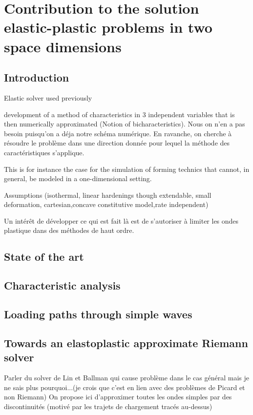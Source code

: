 \chapter{Contribution to the solution elastic-plastic problems in two space dimensions}

\section*{Introduction}
Elastic solver used previously

\cite{Clifton_thesis} development of a method of characteristics in 3 independent variables that is then numerically approximated (Notion of bicharacteristics). Nous on n'en a pas besoin puisqu'on a déja notre schéma numérique. En ravanche, on cherche à résoudre le problème dans une direction donnée pour lequel la méthode des caractéristiques s'applique.

This is for instance the case for the simulation of forming technics that cannot, in general, be modeled in a one-dimensional setting.

Assumptions (isothermal, linear hardenings though extendable, small deformation, cartesian,concave constitutive model,rate independent)

Un intérêt de développer ce qui est fait là est de s'autoriser à limiter les ondes plastique dans des méthodes de haut ordre.
\section{State of the art}


\section{Characteristic analysis}


\section{Loading paths through simple waves}


\section{Towards an elastoplastic approximate Riemann solver}
Parler du solver de Lin et Ballman qui cause problème dans le cas général mais je ne sais plus pourquoi...(je crois que c'est en lien avec des problèmes de Picard et non Riemann)
On propose ici d'approximer toutes les ondes simples par des discontinuités (motivé par les trajets de chargement tracés au-dessus)
\cite{Lin_et_Ballman}
